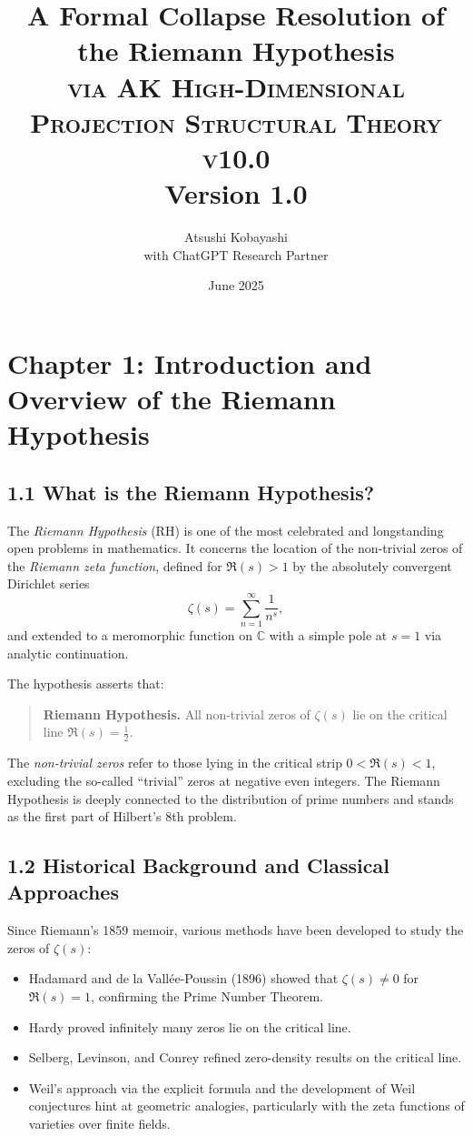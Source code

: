 \documentclass[11pt]{article}
\title{A Formal Collapse Resolution of the Riemann Hypothesis \\ 
\Large \textsc{via AK High-Dimensional Projection Structural Theory v10.0} \\
\small Version 1.0}
\author{Atsushi Kobayashi \\ \small with ChatGPT Research Partner}
\date{June 2025}
\begin{document}
\maketitle
\tableofcontents
\newpage



\section{Chapter 1: Introduction and Overview of the Riemann Hypothesis}

\subsection{1.1 What is the Riemann Hypothesis?}

The \emph{Riemann Hypothesis} (RH) is one of the most celebrated and longstanding open problems in mathematics.  
It concerns the location of the non-trivial zeros of the \emph{Riemann zeta function}, defined for $\Re(s) > 1$ by the absolutely convergent Dirichlet series
\[
\zeta(s) = \sum_{n=1}^\infty \frac{1}{n^s},
\]
and extended to a meromorphic function on $\mathbb{C}$ with a simple pole at $s = 1$ via analytic continuation.

The hypothesis asserts that:

\begin{quote}
\textbf{Riemann Hypothesis.} All non-trivial zeros of $\zeta(s)$ lie on the critical line $\Re(s) = \tfrac{1}{2}$.
\end{quote}

The \emph{non-trivial zeros} refer to those lying in the critical strip $0 < \Re(s) < 1$, excluding the so-called ``trivial'' zeros at negative even integers.  
The Riemann Hypothesis is deeply connected to the distribution of prime numbers and stands as the first part of Hilbert's 8th problem.

\subsection{1.2 Historical Background and Classical Approaches}

Since Riemann’s 1859 memoir, various methods have been developed to study the zeros of $\zeta(s)$:

\begin{itemize}
    \item Hadamard and de la Vallée-Poussin (1896) showed that $\zeta(s) \ne 0$ for $\Re(s) = 1$, confirming the Prime Number Theorem.
    \item Hardy proved infinitely many zeros lie on the critical line.
    \item Selberg, Levinson, and Conrey refined zero-density results on the critical line.
    \item Weil's approach via the explicit formula and the development of Weil conjectures hint at geometric analogies, particularly with the zeta functions of varieties over finite fields.
\end{itemize}
\end{document}
